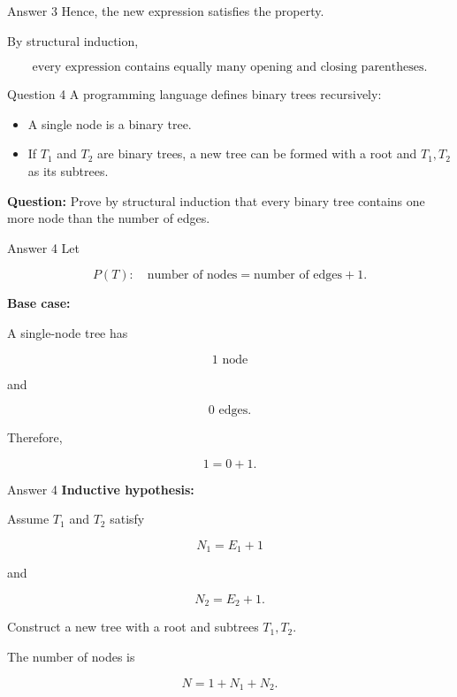 \begin{frame}{Answer 3}
Hence, the new expression satisfies the property.

By structural induction,

$$
\boxed{
\text{every expression contains equally many opening and closing parentheses.}
}
$$

\end{frame}


\begin{frame}{Question 4}
A programming language defines binary trees recursively:

\begin{itemize}
\item A single node is a binary tree.
\item If $T_1$ and $T_2$ are binary trees, a new tree can be formed with a root and $T_1,T_2$ as its subtrees.
\end{itemize}

\textbf{Question:} Prove by structural induction that every binary tree contains one more node than the number of edges.
\end{frame}

\begin{frame}{Answer 4}
Let

$$
P(T):\quad
\text{number of nodes}
=
\text{number of edges}+1.
$$

\textbf{Base case:}

A single-node tree has

$$
1\text{ node}
$$

and

$$
0\text{ edges}.
$$

Therefore,

$$
1=0+1.
$$

\end{frame}

\begin{frame}{Answer 4}
\textbf{Inductive hypothesis:}

Assume $T_1$ and $T_2$ satisfy

$$
N_1=E_1+1
$$

and

$$
N_2=E_2+1.
$$

Construct a new tree with a root and subtrees $T_1,T_2$.

The number of nodes is

$$
N=1+N_1+N_2.
$$

\end{frame}


